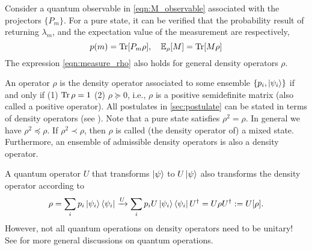 Consider a quantum observable in \cref{eqn:M_observable} associated with the projectors $\{P_m\}$. For a pure state, it can be verified that the probability result of returning $\lambda_m$, and the expectation value of the measurement are respectively,
\begin{equation}
p(m)=\operatorname{Tr}[P_m\rho], \quad \mathbb{E}_{\rho}[M]=\operatorname{Tr}[M \rho]
\label{eqn:measure_rho}
\end{equation}
The expression \eqref{eqn:measure_rho} also holds for general density operators $\rho$.

An operator $\rho$ is the density operator associated to some ensemble $\{p_i, \ket{\psi_i}\}$ if and only if (1) $\operatorname{Tr} \rho=1$ (2) $\rho \succeq 0$, i.e., $\rho$ is a positive semidefinite matrix (also called a positive operator). All postulates in \cref{sec:postulate} can be stated in terms of density operators (see \cite[Section 2.4.2]{NielsenChuang2000}). Note that a pure state satisfies $\rho^2=\rho$. In general we have $\rho^2\preceq \rho$. If $\rho^2\prec \rho$, then $\rho$ is called (the density operator of) a mixed state. Furthermore, an ensemble of admissible density operators is also a density operator.

A quantum operator $U$ that transforms $\ket{\psi}$ to $U\ket{\psi}$ also transforms the density operator according to
\begin{equation}
  \rho=\sum_i p_i \ket{\psi_i}\bra{\psi_i}\xrightarrow{U}
\sum_i p_i U\ket{\psi_i}\bra{\psi_i}U^{\dag} = U\rho U^{\dag}:=U[\rho].
\end{equation}
However, not all quantum operations on density operators need to be unitary! 
See \cite[Section 8.2]{NielsenChuang2000} for more general discussions on quantum operations.

